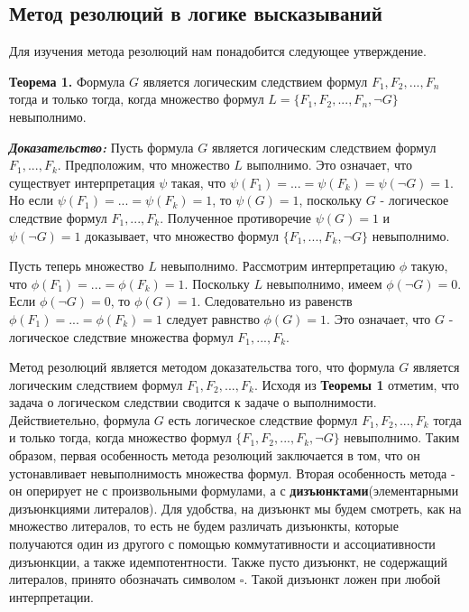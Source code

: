 \documentclass[12pt, a4paper]{article}
\begin{document}
	 \begin{center}
	 	\subsection{Метод резолюций в логике высказываний}
	 \end{center} 
	 \par Для изучения метода резолюций нам понадобится следующее утверждение.\\
	 \par \textbf{Теорема 1.} Формула $G$ является логическим следствием формул $F_{1}, F_{2}, ... , F_{n}$ тогда и только тогда, когда множество формул $L = \{ F_{1}, F_{2}, ... , F_{n}, \neg G\}$ невыполнимо. \\
	 \par \textbf{\textit{Доказательство:}} Пусть формула $G$ является логическим следствием формул $F_{1}, ... , F_{k}$. Предположим, что множество $L$ выполнимо. Это означает, что существует интерпретация $\psi$ такая, что $\psi(F_{1}) = ... = \psi(F_{k}) = \psi(\neg G) = 1$. Но если $\psi(F_{1}) = ... = \psi(F_{k}) = 1$, то $\psi(G) = 1$, поскольку $G$ - логическое следствие формул $F_{1}, ... , F_{k}$. Полученное противоречие $\psi(G) = 1$ и $\psi(\neg G) = 1$ доказывает, что множество формул $\{  F_{1}, ... , F_{k}, \neg G \}$ невыполнимо. 
	 \par Пусть теперь множество $L$ невыполнимо. Рассмотрим интерпретацию $\phi$ такую, что $\phi (F_{1} ) = ... = \phi (F_{k}) = 1$. Поскольку $L$ невыполнимо, имеем $\phi( \neg G) = 0$. Если $\phi( \neg G) = 0$, то $\phi(G) = 1$. Следовательно из равенств $\phi (F_{1} ) = ... = \phi (F_{k}) = 1$ следует равнство  $\phi(G) = 1$. Это означает, что $G$ - логическое следствие множества формул $F_{1}, ... , F_{k}$.
	 \par Метод резолюций является методом доказательства того, что формула $G$ является логическим следствием формул $F_{1}, F_{2}, ... , F_{k}$. Исходя из \textbf{Теоремы 1} отметим, что задача о логическом следствии сводится к задаче о выполнимости. Действиетельно, формула $G$ есть логическое следствие формул  $F_{1}, F_{2}, ... , F_{k}$ тогда и только тогда, когда множество формул $ \{ F_{1}, F_{2}, ... , F_{k}, \neg G \}$ невыполнимо. Таким образом, первая особенность метода резолюций заключается в том, что он устонавливает невыполнимость множества формул. Вторая особенность метода - он оперирует не с произвольными формулами, а с \textbf{дизъюнктами}(элементарными дизъюнкциями литералов). Для удобства, на дизъюнкт мы будем смотреть, как на множество литералов, то есть не будем различать дизъюнкты, которые получаются один из другого с помощью коммутативности и ассоциативности дизъюнкции, а также идемпотентности. Также пусто дизъюнкт, не содержащий литералов, принято обозначать символом $\square$. Такой дизъюнкт ложен при любой интерпретации.
\end{document}
